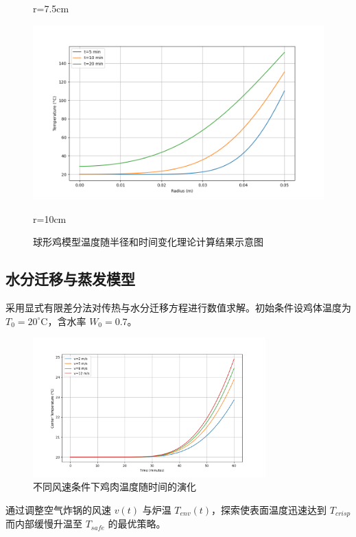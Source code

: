\documentclass[12pt]{article}
\begin{document}
\begin{figure}[htbp]
\begin{minipage}{0.32\linewidth}
		\centerline{r=7.5cm}
	\end{minipage}
	\begin{minipage}{0.32\linewidth}
		\vspace{3pt}
		\centerline{\includegraphics[width=\textwidth]{heat_distribution3.png}}
		\centerline{r=10cm}
	\end{minipage}
	\caption{球形鸡模型温度随半径和时间变化理论计算结果示意图}
	\label{fig:chicken}
\end{figure}

\subsection{水分迁移与蒸发模型}
采用显式有限差分法对传热与水分迁移方程进行数值求解。初始条件设鸡体温度为 $T_0 = 20^\circ$C，含水率 $W_0 = 0.7$。

\begin{figure}[htbp]
\centering
\includegraphics[width=0.8\textwidth]{wind.jpg}
\caption{不同风速条件下鸡肉温度随时间的演化}
\end{figure}

通过调整空气炸锅的风速 $v(t)$ 与炉温 $T_{env}(t)$，探索使表面温度迅速达到 $T_{crisp}$ 而内部缓慢升温至 $T_{safe}$ 的最优策略。
\end{document}
